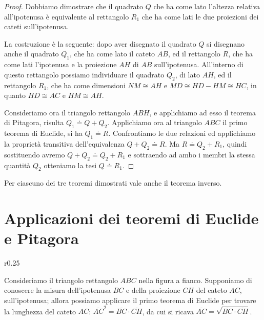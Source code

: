 \noindent\begin{minipage}{0.6\textwidth}\parindent15pt
\begin{proof}
Dobbiamo dimostrare che il quadrato $Q$ che ha come lato l'altezza 
relativa all'ipotenusa è equivalente al rettangolo $R_1$ che ha come 
lati le due proiezioni dei cateti sull'ipotenusa.

La costruzione è la seguente: dopo aver disegnato il quadrato $Q$ si 
disegnano anche il quadrato $Q_1$, che ha come lato il cateto $AB$, 
ed il rettangolo $R$, che ha come lati l'ipotenusa e la proiezione 
$AH$ di $AB$ sull'ipotenusa. All'interno di questo rettangolo 
possiamo individuare il quadrato $Q_2$, di lato $AH$, ed il rettangolo 
$R_1$, che ha come dimensioni $NM\cong AH$ e $MD\cong HD-HM\cong HC$, 
in quanto $HD\cong AC$ e $HM\cong AH$.

Consideriamo ora il triangolo rettangolo $ABH$, e applichiamo ad esso 
il teorema di Pitagora, risulta $Q_1\doteq Q+Q_2$. Applichiamo ora al 
triangolo $ABC$ il primo teorema di Euclide, si ha $Q_1\doteq R$. 
Confrontiamo le due relazioni ed applichiamo la proprietà transitiva 
dell'equivalenza $Q+Q_2\doteq R$. Ma $R\doteq Q_2 + R_1$, quindi 
sostituendo avremo $Q+Q_2\doteq Q_2 + R_1$ e sottraendo ad ambo i 
membri la stessa quantità $Q_2$ otteniamo la tesi $Q\doteq R_1$.
\end{proof}
\end{minipage}\hfil
\begin{minipage}{0.4\textwidth}
  \centering
\end{minipage}\vspace{8pt}

Per ciascuno dei tre teoremi dimostrati vale anche il teorema inverso.

\newpage %

\section{Applicazioni dei teoremi di Euclide e Pitagora}
\label{sect:applicazioni_pitagora_euclide}

\begin{wrapfigure}{r}{0.25\textwidth}
  \centering
\end{wrapfigure}
Consideriamo il triangolo rettangolo $ABC$ nella figura a fianco.
Supponiamo di conoscere la misura dell'ipotenusa $BC$ e della 
proiezione $CH$ del cateto $AC$, sull'ipotenusa; allora possiamo 
applicare il primo teorema di Euclide per trovare la lunghezza del 
cateto $AC$: $\overline{AC}^2=\overline{BC}\cdot \overline{CH}$, da 
cui si ricava $\overline{AC}=\sqrt{\overline{BC}\cdot \overline{CH}}$.


